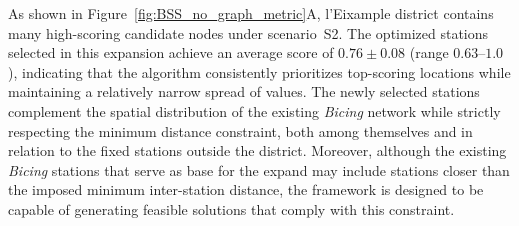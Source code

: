     As shown in Figure~\ref{fig:BSS_no_graph_metric}A, l'Eixample district contains many high-scoring candidate nodes under scenario~S2. The optimized stations selected in this expansion achieve an average score of $0.76 \pm 0.08$ (range $0.63$–$1.0$), indicating that the algorithm consistently prioritizes top-scoring locations while maintaining a relatively narrow spread of values. The newly selected stations complement the spatial distribution of the existing \textit{Bicing} network while strictly respecting the minimum distance constraint, both among themselves and in relation to the fixed stations outside the district. Moreover, although the existing \textit{Bicing} stations that serve as base for the expand may include stations closer than the imposed minimum inter-station distance, the framework is designed to be capable of generating feasible solutions that comply with this constraint.  

